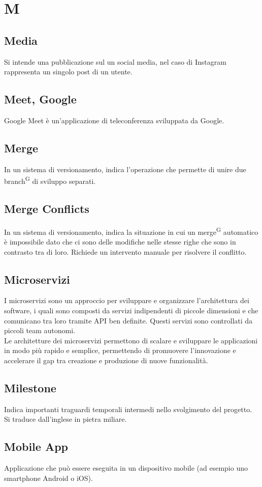 \section{M}


\subsection{Media}
Si intende una pubblicazione sul un social media, nel caso di Instagram rappresenta un singolo post di un utente.

\subsection{Meet, Google}
Google Meet è un'applicazione di teleconferenza sviluppata da Google. 

\subsection{Merge}
In un sistema di versionamento, indica l'operazione che permette di unire due branch\textsuperscript{G} di sviluppo separati.

\subsection{Merge Conflicts}
In un sistema di versionamento, indica la situazione in cui un merge\textsuperscript{G} automatico è impossibile dato che ci sono delle modifiche nelle stesse righe che sono in contrasto tra di loro. Richiede un intervento manuale  per risolvere il conflitto.

\subsection{Microservizi} I microservizi sono un approccio per sviluppare e organizzare l’architettura dei software, i quali sono composti da servizi indipendenti di piccole dimensioni e che comunicano tra loro tramite API ben definite. Questi servizi sono controllati da piccoli team autonomi. \\
Le architetture dei microservizi permettono di scalare e sviluppare le applicazioni in modo più rapido e semplice, permettendo di promuovere l’innovazione e accelerare il gap tra creazione e produzione di nuove funzionalità.

\subsection{Milestone}
Indica importanti traguardi temporali intermedi nello svolgimento del progetto. Si traduce dall'inglese in pietra miliare. 

\subsection{Mobile App} Applicazione che può essere eseguita in un dispositivo mobile (ad esempio uno smartphone Android o iOS).

\clearpage